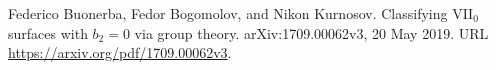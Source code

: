 Federico Buonerba, Fedor Bogomolov, and Nikon Kurnosov.
\newblock Classifying {VII}$_0$ surfaces with $b_2=0$ via group theory.
\newblock arXiv:1709.00062v3, 20 May 2019.
\newblock URL \url{https://arxiv.org/pdf/1709.00062v3}.


